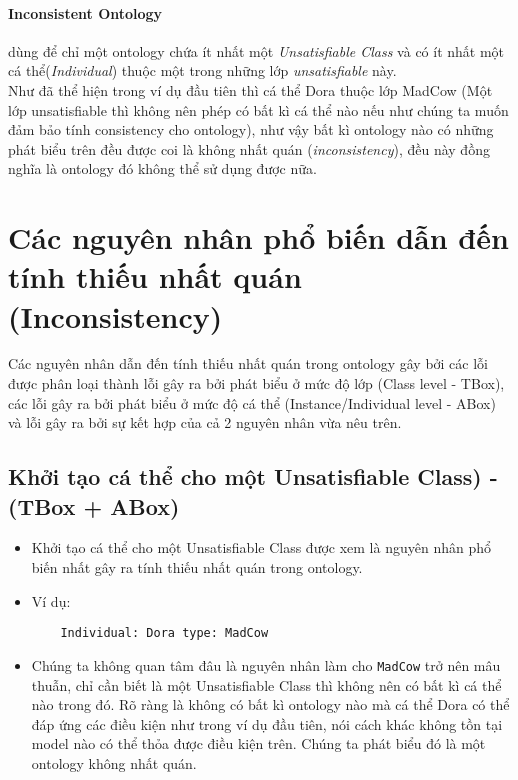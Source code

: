 \paragraph{Inconsistent Ontology} dùng để chỉ một ontology chứa ít nhất một \textit{Unsatisfiable Class} và có ít nhất một cá thể(\textit{Individual}) thuộc một trong những lớp \textit{unsatisfiable} này.
\\
\hspace{0.05\textwidth} Như đã thể hiện trong ví dụ đầu tiên thì cá thể Dora thuộc lớp MadCow (Một lớp unsatisfiable thì không nên phép có bất kì cá thể nào nếu như chúng ta muốn đảm bảo tính consistency cho ontology), như vậy bất kì ontology nào có những phát biểu trên đều được coi là không nhất quán (\textit{inconsistency}), đều này đồng nghĩa là ontology đó không thể sử dụng được nữa.

\section{Các nguyên nhân phổ biến dẫn đến tính thiếu nhất quán (Inconsistency)\cite{inconsitentReason}}
Các nguyên nhân dẫn đến tính thiếu nhất quán trong ontology gây bởi các lỗi được phân loại thành lỗi gây ra bởi phát biểu ở mức độ lớp (Class level - TBox), các lỗi gây ra bởi phát biểu ở mức độ cá thể (Instance/Individual level - ABox) và lỗi gây ra bởi sự kết hợp của cả 2 nguyên nhân vừa nêu trên.
\subsection{Khởi tạo cá thể cho một Unsatisfiable Class) - (TBox + ABox)}
\begin{itemize}
\item
Khởi tạo cá thể cho một Unsatisfiable Class được xem là nguyên nhân phổ biến nhất gây ra tính thiếu nhất quán trong ontology.
\item
Ví dụ:
\begin{verbatim}
	Individual: Dora type: MadCow
\end{verbatim}
\item
Chúng ta không quan tâm đâu là nguyên nhân làm cho \texttt{MadCow} trở nên mâu thuẫn, chỉ cần biết là một Unsatisfiable Class thì không nên có bất kì cá thể nào trong đó. Rõ ràng là không có bất kì ontology nào mà cá thể Dora có thể đáp ứng các điều kiện như trong ví dụ đầu tiên, nói cách khác không tồn tại model nào có thể thỏa được điều kiện trên. Chúng ta phát biểu đó là một ontology không nhất quán.
\end{itemize}

